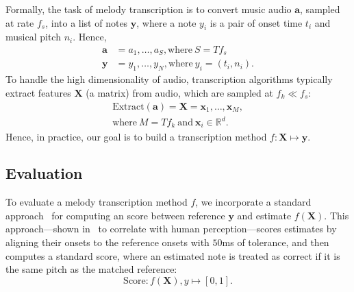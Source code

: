 Formally, the task of melody transcription is to convert music audio $\bm{a}$, sampled at rate $f_s$, into a list of notes $\bm{y}$, where a note $y_i$ is a pair of onset time $t_i$ and musical pitch $n_i$. Hence, 
\begin{align*}
    \bm{a} &= a_1, \ldots, a_S, \text{where}~S = Tf_s \\
    \bm{y} &= y_1, \ldots, y_N, \text{where}~y_i = (t_i, n_i).
\end{align*}
To handle the high dimensionality of audio, transcription algorithms typically extract features $\bm{X}$ (a matrix) from audio, which are sampled at $f_k \ll f_s$:
\begin{align*}
    \text{Extract}(\bm{a}) = \bm{X} = \bm{x}_1, \ldots, \bm{x}_M, \\ 
    \text{where}~M = Tf_k~\text{and}~\bm{x}_i \in \mathbb{R}^d.
\end{align*}
Hence, in practice, our goal is to build a transcription method 
$f : \bm{X} \mapsto \bm{y}$.

\subsection{Evaluation}
\label{sec:eval}

To evaluate a melody transcription method $f$, 
we incorporate a standard approach~\cite{raffel2014eval} for computing an \fone{} score between reference $\bm{y}$ and estimate $f(\bm{X})$. 
This approach---shown in~\cite{ycart2020investigating} to correlate with human perception---scores estimates by aligning their onsets to the reference onsets with $50$ms of tolerance, and then computes a standard \fone{} score, where an estimated note is treated as correct if it is the same pitch as the matched reference:
\begin{equation*}
    \text{Score} : f(\bm{X}), y \mapsto [0, 1].
\end{equation*}


